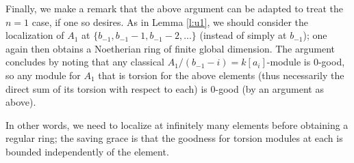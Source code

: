Finally, we make a remark that the above argument can be adapted to
treat the $n = 1$ case, if one so desires. As in Lemma \ref{l:u1},
we should consider the localization of
$A_1$ at $\{b_{-1},b_{-1}-1,b_{-1}-2,\ldots\}$
(instead of simply at $b_{-1}$); one again then obtains a Noetherian ring
of finite global dimension. The argument concludes by noting that
any classical $A_1/(b_{-1}-i) = k[a_i]$-module is $0$-good, so
any module for $A_1$ that is torsion for the above elements (thus
necessarily the direct sum of its torsion with respect to each) is
$0$-good (by an argument as above).

In other words, we need to localize at infinitely many elements before
obtaining a regular ring; the saving
grace is that the goodness for torsion modules at each is bounded independently
of the element.
